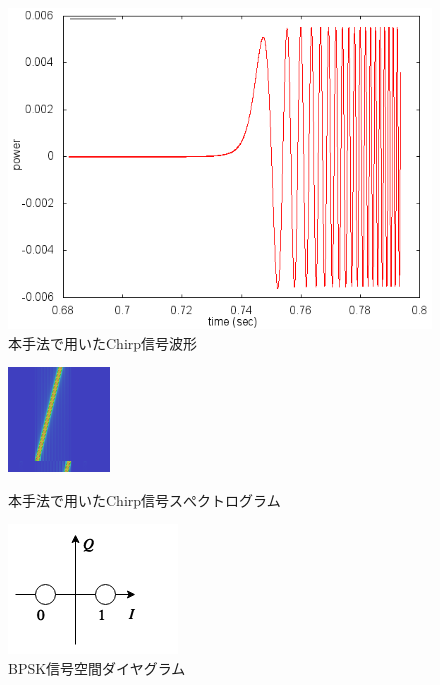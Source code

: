 \begin{figure}[pb]\centering
\includegraphics[clip,width=1.0\hsize]{img/chirp.png}
\caption{本手法で用いたChirp信号波形}\label{fig:chirpsig}

\end{figure}

\begin{figure}[pb]\centering
\includegraphics[clip,width=0.7\hsize]{img/chirp_spectogram.png}\\
\caption{本手法で用いたChirp信号スぺクトログラム}\label{fig:chirpsig2}

\end{figure}


\begin{figure}[pb]\centering
\includegraphics[clip,width=0.27\hsize]{img/chirp_qi.png}
\caption{BPSK信号空間ダイヤグラム}\label{fig:chirpqi}
\end{figure}




